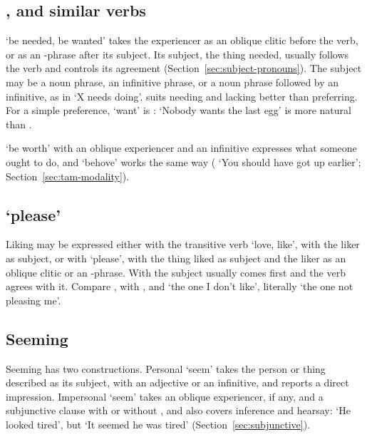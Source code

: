 \subsection{,  and similar verbs}
 `be needed, be wanted' takes the experiencer as an oblique clitic before the verb, or as an -phrase after its subject. Its subject, the thing needed, usually follows the verb and controls its agreement (Section~\ref{sec:subject-pronouns}). The subject may be a noun phrase, an infinitive phrase, or a noun phrase followed by an infinitive, as in `X needs doing'.
 suits needing and lacking better than preferring. For a simple preference, `want' is :  `Nobody wants the last egg' is more natural than .

 `be worth' with an oblique experiencer and an infinitive expresses what someone ought to do, and  `behove' works the same way ( `You should have got up earlier'; Section~\ref{sec:tam-modality}).

\subsection{ `please'}
Liking may be expressed either with the transitive verb  `love, like', with the liker as subject, or with  `please', with the thing liked as subject and the liker as an oblique clitic or an -phrase. With  the subject usually comes first and the verb agrees with it.
Compare , with , and  `the one I don't like', literally `the one not pleasing me'.

\subsection{Seeming}
Seeming has two constructions. Personal  `seem' takes the person or thing described as its subject, with an adjective or an infinitive, and reports a direct impression. Impersonal  `seem' takes an oblique experiencer, if any, and a subjunctive clause with or without , and also covers inference and hearsay:  `He looked tired', but  `It seemed he was tired' (Section~\ref{sec:subjunctive}).

